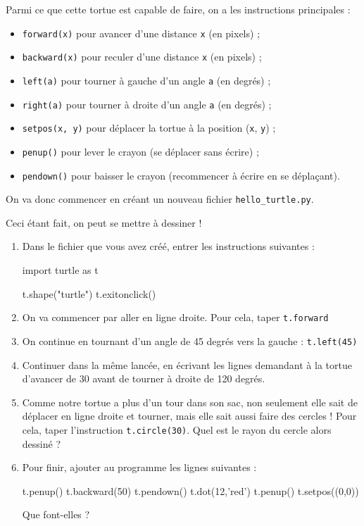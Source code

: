 \documentclass[12pt,a4paper, oneside]{article}
\theoremstyle{definition}
\begin{document}
      Parmi ce que cette tortue est capable de faire, on a les instructions principales :
      \begin{itemize}
         \item \texttt{forward(x)} pour avancer d'une distance \texttt{x} (en pixels) ;
         \item \texttt{backward(x)} pour reculer d'une distance \texttt{x} (en pixels) ;
         \item \texttt{left(a)} pour tourner à gauche d'un angle \texttt{a} (en degrés) ;
         \item \texttt{right(a)} pour tourner à droite d'un angle \texttt{a} (en degrés) ;
         \item \texttt{setpos(x, y)} pour déplacer la tortue à la position (\texttt{x}, \texttt{y}) ;
         \item \texttt{penup()} pour lever le crayon (se déplacer sans écrire) ;
         \item \texttt{pendown()} pour baisser le crayon (recommencer à écrire en se déplaçant).
      \end{itemize}

      On va donc commencer en créant un nouveau fichier \texttt{hello\_turtle.py}.

      Ceci étant fait, on peut se mettre à dessiner !
      \begin{enumerate}
         \item Dans le fichier que vous avez créé, entrer les instructions suivantes :
         \begin{pyverbatim}
            import turtle as t

            t.shape("turtle")
            t.exitonclick()
         \end{pyverbatim}
         \item On va commencer par aller en ligne droite.
         Pour cela, taper \texttt{t.forward}
         \item On continue en tournant d'un angle de 45 degrés vers la gauche : \texttt{t.left(45)}
         \item Continuer dans la même lancée, en écrivant les lignes demandant à la tortue d'avancer de 30 avant de tourner à droite de 120 degrés.
         \item Comme notre tortue a plus d'un tour dans son sac, non seulement elle sait de déplacer en ligne droite et tourner, mais elle sait aussi faire des cercles !
         Pour cela, taper l'instruction \texttt{t.circle(30)}.
         Quel est le rayon du cercle alors dessiné ?
         \item Pour finir, ajouter au programme les lignes suivantes :
         \begin{pyverbatim}
            t.penup()
            t.backward(50)
            t.pendown()
            t.dot(12,'red')
            t.penup()
            t.setpos((0,0))
         \end{pyverbatim}
         Que font-elles ?
      \end{enumerate}
   
\end{document}
